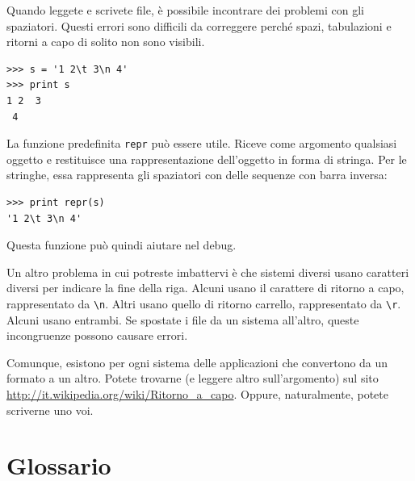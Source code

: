 \documentclass[10pt]{book}
\begin{document}
Quando leggete e scrivete file, è possibile incontrare dei problemi con gli spaziatori. Questi errori sono difficili da correggere perché spazi, tabulazioni e ritorni a capo di solito non sono visibili.

\begin{verbatim}
>>> s = '1 2\t 3\n 4'
>>> print s
1 2	 3
 4
\end{verbatim}

La funzione predefinita {\tt repr} può essere utile. Riceve come argomento qualsiasi oggetto e restituisce una rappresentazione dell'oggetto in forma di stringa. Per le stringhe, essa rappresenta gli spaziatori con delle sequenze con barra inversa:

\begin{verbatim}
>>> print repr(s)
'1 2\t 3\n 4'
\end{verbatim}

Questa funzione può quindi aiutare nel debug.

Un altro problema in cui potreste imbattervi è che sistemi diversi usano caratteri diversi per indicare la fine della riga. Alcuni usano il carattere di ritorno a capo, rappresentato da \verb"\n".  Altri usano quello di ritorno carrello, rappresentato da \verb"\r".  Alcuni usano entrambi. Se spostate i file da un sistema all'altro, queste incongruenze possono causare errori.

Comunque, esistono per ogni sistema delle applicazioni che convertono da un formato a un altro. Potete trovarne (e leggere altro sull'argomento) sul sito \url{http://it.wikipedia.org/wiki/Ritorno_a_capo}.  Oppure, naturalmente, potete scriverne uno voi.


\section{Glossario}
\end{document}
